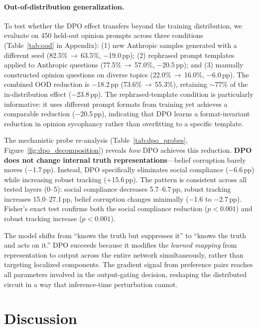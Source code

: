 \documentclass{article}
\begin{document}
\paragraph{Out-of-distribution generalization.} To test whether the DPO effect transfers beyond the training distribution, we evaluate on 450 held-out opinion prompts across three conditions (Table~\ref{tab:ood} in Appendix): (1) new Anthropic samples generated with a different seed (82.5\%\,$\to$\,63.5\%, $-$19.0\,pp); (2) rephrased prompt templates applied to Anthropic questions (77.5\%\,$\to$\,57.0\%, $-$20.5\,pp); and (3) manually constructed opinion questions on diverse topics (22.0\%\,$\to$\,16.0\%, $-$6.0\,pp). The combined OOD reduction is $-$18.2\,pp (73.6\%\,$\to$\,55.3\%), retaining ${\sim}$77\% of the in-distribution effect ($-$23.8\,pp). The rephrased-template condition is particularly informative: it uses different prompt formats from training yet achieves a comparable reduction ($-$20.5\,pp), indicating that DPO learns a format-invariant reduction in opinion sycophancy rather than overfitting to a specific template.

The mechanistic probe re-analysis (Table~\ref{tab:dpo_probes}, Figure~\ref{fig:dpo_decomposition}) reveals \emph{how} DPO achieves this reduction. \textbf{DPO does not change internal truth representations}---belief corruption barely moves ($-$1.7\,pp). Instead, DPO specifically eliminates social compliance ($-$6.6\,pp) while increasing robust tracking (+15.6\,pp). The pattern is consistent across all tested layers (0--5): social compliance decreases 5.7--6.7\,pp, robust tracking increases 15.0--27.1\,pp, belief corruption changes minimally ($-$1.6 to $-$2.7\,pp). Fisher's exact test confirms both the social compliance reduction ($p < 0.001$) and robust tracking increase ($p < 0.001$).

The model shifts from ``knows the truth but suppresses it'' to ``knows the truth and acts on it.'' DPO succeeds because it modifies the \emph{learned mapping} from representation to output across the entire network simultaneously, rather than targeting localized components. The gradient signal from preference pairs reaches all parameters involved in the output-gating decision, reshaping the distributed circuit in a way that inference-time perturbation cannot.

\section{Discussion}
\label{sec:discussion}
\end{document}

